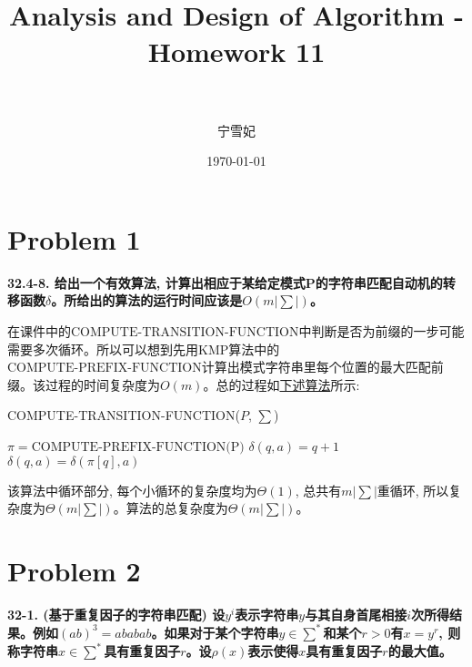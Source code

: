 \documentclass[paper=a4, fontsize=11pt]{scrartcl} %
\title{	
\normalfont \normalsize 
\horrule{0.5pt} \\[0.4cm] %
\huge Analysis and Design of Algorithm - Homework 11\\ %
\horrule{2pt} \\[0.5cm] %
}
\author{宁雪妃} %
\date{\normalsize{\AdvanceDate[-1]\today}} %
\numberwithin{equation}{section} %
\numberwithin{figure}{section} %
\numberwithin{table}{section} %
\begin{document}
\maketitle %

\section{Problem 1}
\textbf{32.4-8. 给出一个有效算法, 计算出相应于某给定模式P的字符串匹配自动机的转移函数$\delta$。所给出的算法的运行时间应该是$O(m |\sum|)$。}

在课件中的$\mbox{COMPUTE-TRANSITION-FUNCTION}$中判断是否为前缀的一步可能需要多次循环。所以可以想到先用KMP算法中的$\mbox{COMPUTE-PREFIX-FUNCTION}$计算出模式字符串里每个位置的最大匹配前缀。该过程的时间复杂度为$O(m)$。总的过程如\hyperref[algo:1-1]{下述算法}所示:

  \begin{algorithm}[H]
  \caption{COMPUTE-TRANSITION-FUNCTION($P$, $\sum$)}
  \label{algo:1-1}
  \begin{algorithmic}
    \State $\pi = \mbox{COMPUTE-PREFIX-FUNCTION(P)}$
    \State $\delta(q, a) = q + 1$
    \Else
    \State $\delta(q, a) = \delta(\pi[q], a)$
    \EndIf
    \EndFor
    \EndFor
  \end{algorithmic}
\end{algorithm}

  该算法中循环部分, 每个小循环的复杂度均为$\Theta(1)$, 总共有$m|\sum|$重循环, 所以复杂度为$\Theta(m|\sum|)$。算法的总复杂度为$\Theta(m|\sum|)$。

\section{Problem 2}
\textbf{32-1. (基于重复因子的字符串匹配) 设$y^i$表示字符串$y$与其自身首尾相接$i$次所得结果。例如${(ab)}^3=ababab$。如果对于某个字符串$y \in \sum^{*}$和某个$r > 0$有$x = y^r$, 则称字符串$x \in \sum^{*}$具有重复因子$r$。设$\rho(x)$表示使得$x$具有重复因子$r$的最大值。}
\end{document}
